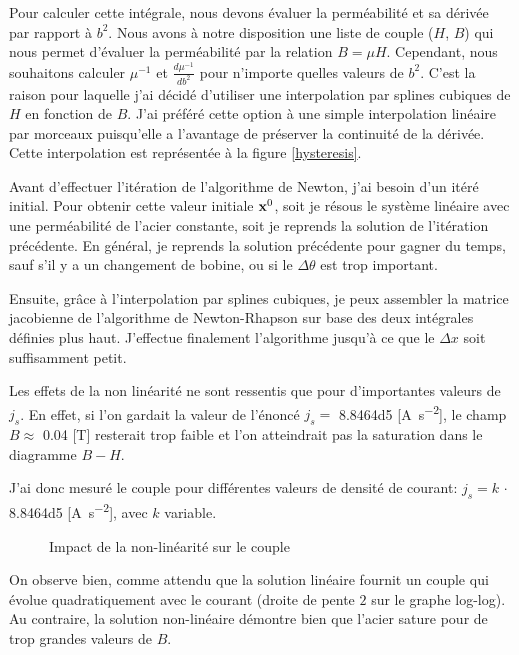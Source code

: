 \documentclass[11 pt]{article}
\begin{document}
\begin{appendices}
Pour calculer cette intégrale, nous devons évaluer la perméabilité et sa dérivée par rapport à $b^2$. Nous avons à notre disposition une liste de couple ($H$, $B$) qui nous permet d'évaluer la perméabilité par la relation $B = \mu H$. Cependant, nous souhaitons calculer $\mu^{-1}$ et $\frac{d\mu^{-1}}{db^2}$ pour n'importe quelles valeurs de $b^2$. C'est la raison pour laquelle j'ai décidé d'utiliser une interpolation par splines cubiques de $H$ en fonction de $B$. J'ai préféré cette option à une simple interpolation linéaire par morceaux puisqu'elle a l'avantage de préserver la continuité de la dérivée. Cette interpolation est représentée à la figure \ref{hysteresis}.

Avant d'effectuer l'itération de l'algorithme de Newton, j'ai besoin d'un itéré initial. Pour obtenir cette valeur initiale $\mathbf{x}^0$, soit je résous le système linéaire avec une perméabilité de l'acier constante, soit je reprends la solution de l'itération précédente. En général, je reprends la solution précédente pour gagner du temps, sauf s'il y a un changement de bobine, ou si le $\Delta \theta$ est trop important.

Ensuite, grâce à l'interpolation par splines cubiques, je peux assembler la matrice jacobienne de l'algorithme de Newton-Rhapson sur base des deux intégrales définies plus haut. J'effectue finalement l'algorithme jusqu'à ce que le $\Delta x$ soit suffisamment petit.

Les effets de la non linéarité ne sont ressentis que pour d'importantes valeurs de $j_s$. En effet, si l'on gardait la valeur de l'énoncé $j_s = $ \num{8.8464d5} [\si{A.s^{-2}}], le champ $B \approx$ \num{0.04} [\si{T}] resterait trop faible et l'on atteindrait pas la saturation dans le diagramme $B - H$.

J'ai donc mesuré le couple pour différentes valeurs de densité de courant: $j_s = k \, \cdot$ \num{8.8464d5} [\si{A.s^{-2}}], avec $k$ variable.


\begin{figure}[!h]
    \centering
    
    \caption{Impact de la non-linéarité sur le couple}
    \label{nonlinear}
\end{figure}

On observe bien, comme attendu que la solution linéaire fournit un couple qui évolue quadratiquement avec le courant (droite de pente $2$ sur le graphe log-log). Au contraire, la solution non-linéaire démontre bien que l'acier sature pour de trop grandes valeurs de $B$.

\end{appendices}


\end{document}
